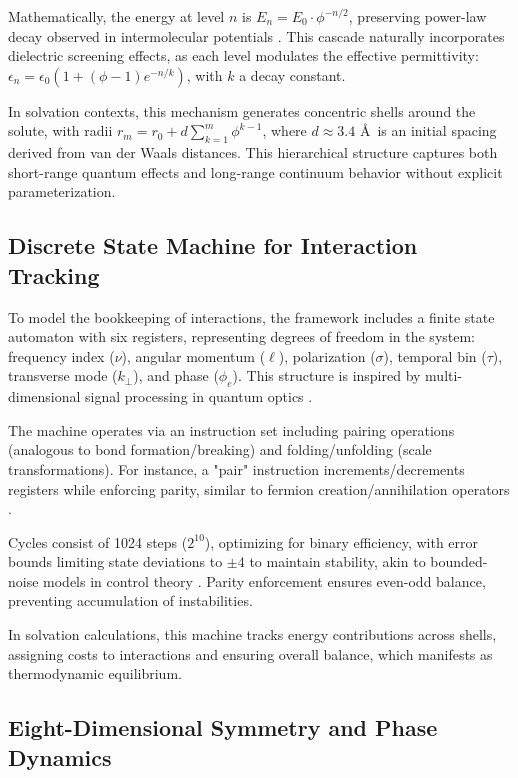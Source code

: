 \documentclass[twocolumn,prd,amsmath,amssymb,aps,superscriptaddress,nofootinbib]{revtex4-2}
\begin{document}
Mathematically, the energy at level $n$ is $E_n = E_0 \cdot \phi^{-n/2}$, preserving power-law decay observed in intermolecular potentials \cite{Stone2013}. This cascade naturally incorporates dielectric screening effects, as each level modulates the effective permittivity: $\epsilon_n = \epsilon_0 (1 + (\phi-1) e^{-n/k})$, with $k$ a decay constant.

In solvation contexts, this mechanism generates concentric shells around the solute, with radii $r_m = r_0 + d \sum_{k=1}^m \phi^{k-1}$, where $d \approx 3.4$ \AA\ is an initial spacing derived from van der Waals distances. This hierarchical structure captures both short-range quantum effects and long-range continuum behavior without explicit parameterization.

\subsection{Discrete State Machine for Interaction Tracking}

To model the bookkeeping of interactions, the framework includes a finite state automaton with six registers, representing degrees of freedom in the system: frequency index ($\nu$), angular momentum ($\ell$), polarization ($\sigma$), temporal bin ($\tau$), transverse mode ($k_\perp$), and phase ($\phi_e$). This structure is inspired by multi-dimensional signal processing in quantum optics \cite{Boyd2008}.

The machine operates via an instruction set including pairing operations (analogous to bond formation/breaking) and folding/unfolding (scale transformations). For instance, a "pair" instruction increments/decrements registers while enforcing parity, similar to fermion creation/annihilation operators \cite{Dirac1927}.

Cycles consist of 1024 steps ($2^{10}$), optimizing for binary efficiency, with error bounds limiting state deviations to $\pm 4$ to maintain stability, akin to bounded-noise models in control theory \cite{Tempo2013}. Parity enforcement ensures even-odd balance, preventing accumulation of instabilities.

In solvation calculations, this machine tracks energy contributions across shells, assigning costs to interactions and ensuring overall balance, which manifests as thermodynamic equilibrium.

\subsection{Eight-Dimensional Symmetry and Phase Dynamics}
\end{document}
